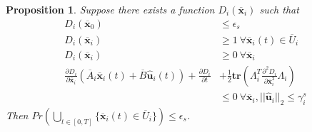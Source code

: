 \documentclass[journal]{IEEEtran}
\newtheorem{proposition}{Proposition}
\begin{document}
\begin{proposition}
\label{prop:barrier-safety}
Suppose there exists a function $D_i(\overline{\mathbf{x}}_i)$ such that
\begin{align}
\label{eq:barrier-safety1}
D_i(\overline{\mathbf{x}}_0) &\leq \epsilon_s \\
\label{eq:barrier-safety2}
D_i(\overline{\mathbf{x}}_i) &\geq 1 \ \forall \overline{\mathbf{x}}_i(t) \in \overline{U}_i \\
\label{eq:barrier-safety3}
D_i(\overline{\mathbf{x}}_i) &\geq 0 \ \forall \overline{\mathbf{x}}_i \\
\frac{\partial D_i}{\partial \overline{\mathbf{x}}_i}(\overline{A}_i\overline{\mathbf{x}}_i(t) + \overline{B}\hat{\mathbf{u}}_i(t)) + \frac{\partial D_i}{\partial t} &+ \frac{1}{2}\mathbf{tr}(\Lambda^{T}_i\frac{\partial^{2}D_i}{\partial \overline{\mathbf{x}}_i^{2}}\Lambda_i) \nonumber\\
\label{eq:barrier-safety4}
&\leq 0 \ \forall \overline{\mathbf{x}}_i, ||\hat{\mathbf{u}}_i||_{2} \leq \gamma_i^{s}
\end{align}
Then $Pr\left(\bigcup_{t \in [0,T]}{\{\overline{\mathbf{x}}_i(t) \in \overline{U}_i\}}\right) \leq \epsilon_s$.
\end{proposition}
\end{document}
